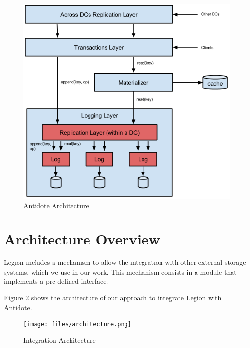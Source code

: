 \begin{figure}[H]
\centering
\includegraphics[scale=0.4]{files/antidoteArchitecture.png}
\caption{Antidote Architecture}
\label{antidote_architecture}
\end{figure}

\section{Architecture Overview}
\label{sec:architecture_overview}
Legion includes a mechanism to allow the integration with other external storage systems, which we use in our work. This mechanism consists in a module that implements a pre-defined interface.\par
	Figure \ref{architecture} shows the architecture of our approach to integrate Legion with Antidote.
	
\begin{figure}[h]
\centering
\texttt{[image: files/architecture.png]}
\caption{Integration Architecture}
\label{architecture}
\end{figure}

